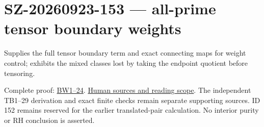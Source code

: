 \documentclass[
]{article}
\author{}
\date{}
\begin{document}
\section{SZ-20260923-153 --- all-prime tensor boundary
weights}\label{sz-20260923-153-all-prime-tensor-boundary-weights}

Supplies the full tensor boundary term and exact connecting maps for
weight control; exhibits the mixed classes lost by taking the endpoint
quotient before tensoring.

Complete proof:
\href{https://github.com/KokunoYumeto/zeta-function-research-reader/blob/main/workbenches/splitzero-tandem/continuations/20260923-retained-source-readers/all-prime-boundary-weights/ROOT_BOUNDARY_WEIGHT_HOMOLOGY.tex}{BW1--24}.
\href{https://github.com/KokunoYumeto/zeta-function-research-reader/blob/main/workbenches/splitzero-tandem/continuations/20260923-retained-source-readers/all-prime-boundary-weights/SOURCE_READING.json}{Human
sources and reading scope}. The independent TB1--29 derivation and exact
finite checks remain separate supporting sources. ID 152 remains
reserved for the earlier translated-pair calculation. No interior purity
or RH conclusion is asserted.
\end{document}
